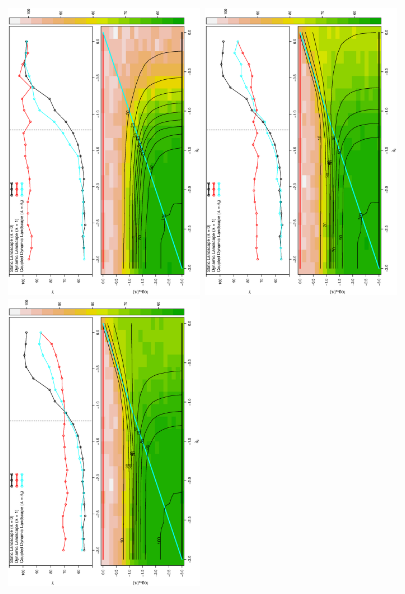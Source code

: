 \documentclass[12pt]{article}
\begin{document}
\begin{figure}[hb!]
\begin{center}
\includegraphics[width=2in,angle=-90]{./figures/Figure_7_0001.eps}\hspace{-0.025 in}
\includegraphics[width=2in,angle=-90]{./figures/Figure_7_00127.eps}\\
\includegraphics[width=2in,angle=-90]{./figures/Figure_7_0113.eps}\hspace{-0.025 in}

\end{center}
\end{figure}
\end{document}

